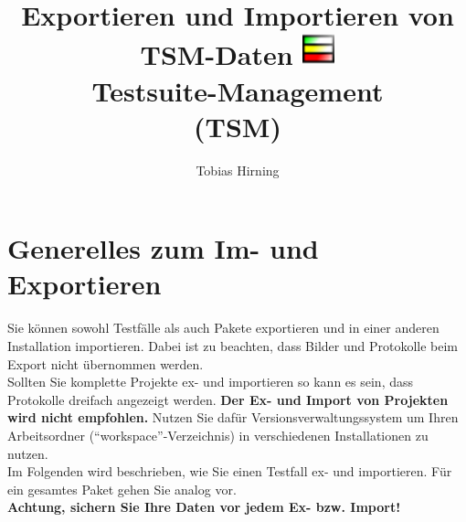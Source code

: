 \documentclass[11pt,a4paper,titlepage]{article}
\title{{\Huge Exportieren und Importieren von TSM-Daten} \linebreak \linebreak
\includegraphics[width= 35px]{../BilderHandbuch/icon32.png} \\
\textbf{Testsuite-Management\\ (TSM)}}
\author{Tobias Hirning}
\begin{document}
\maketitle
\pagebreak

\tableofcontents
\pagebreak

\flushleft
\section{Generelles zum Im- und Exportieren}
Sie können sowohl Testfälle als auch Pakete exportieren und in einer anderen Installation importieren. Dabei ist zu beachten, dass Bilder und Protokolle beim Export nicht übernommen werden.\\
Sollten Sie komplette Projekte ex- und importieren so kann es sein, dass Protokolle dreifach angezeigt werden. \textbf{Der Ex- und Import von Projekten wird nicht empfohlen.} Nutzen Sie dafür Versionsverwaltungssystem um Ihren Arbeitsordner
 ("`workspace"'-Verzeichnis) in verschiedenen Installationen zu nutzen.\\
Im Folgenden wird beschrieben, wie Sie einen Testfall ex- und importieren. Für ein gesamtes Paket gehen Sie analog vor.\\
\vspace{\baselineskip}
\textbf{Achtung, sichern Sie Ihre Daten vor jedem Ex- bzw. Import!}
\end{document}
